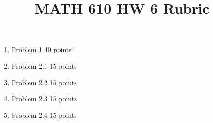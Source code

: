\documentclass{article}
\title{MATH 610 HW 6 Rubric}
\author{}
\date{}
\begin{document}
\maketitle

\begin{enumerate}
	\item Problem 1 40 points
	\item Problem 2.1 15 points
	\item Problem 2.2 15 points
	\item Problem 2.3 15 points
	\item Problem 2.4 15 points
\end{enumerate}
\end{document}
